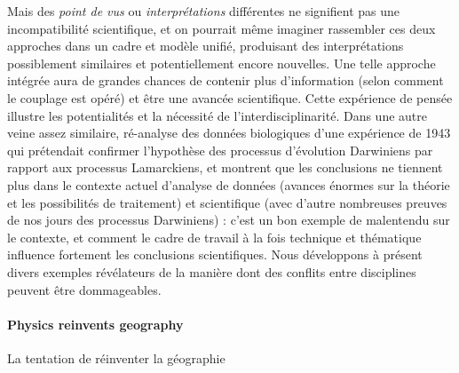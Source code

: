 { Mais des \emph{point de vus} ou \emph{interprétations} différentes ne signifient pas une incompatibilité scientifique, et on pourrait même imaginer rassembler ces deux approches dans un cadre et modèle unifié, produisant des interprétations possiblement similaires et potentiellement encore nouvelles. Une telle approche intégrée aura de grandes chances de contenir plus d'information (selon comment le couplage est opéré) et être une avancée scientifique. Cette expérience de pensée illustre les potentialités et la nécessité de l'interdisciplinarité. Dans une autre veine assez similaire, \cite{2017arXiv170105627H} ré-analyse des données biologiques d'une expérience de 1943 qui prétendait confirmer l'hypothèse des processus d'évolution Darwiniens par rapport aux processus Lamarckiens, et montrent que les conclusions ne tiennent plus dans le contexte actuel d'analyse de données (avances énormes sur la théorie et les possibilités de traitement) et scientifique (avec d'autre nombreuses preuves de nos jours des processus Darwiniens) : c'est un bon exemple de malentendu sur le contexte, et comment le cadre de travail à la fois technique et thématique influence fortement les conclusions scientifiques. Nous développons à présent divers exemples révélateurs de la manière dont des conflits entre disciplines peuvent être dommageables.
}



\paragraph{Physics reinvents geography}{La tentation de réinventer la géographie}


